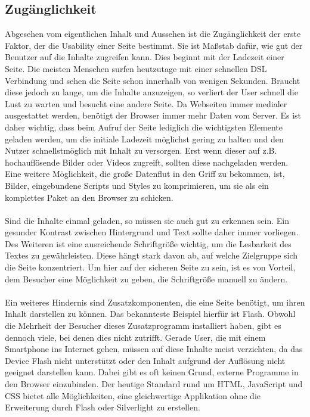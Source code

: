 \subsection{Zugänglichkeit}


Abgesehen vom eigentlichen Inhalt und Aussehen ist die Zugänglichkeit der erste Faktor, der die Usability einer Seite bestimmt. Sie ist Maßstab dafür, wie gut der Benutzer auf die Inhalte zugreifen kann. Dies beginnt mit der Ladezeit einer Seite. Die meisten Menschen surfen heutzutage mit einer schnellen DSL Verbindung und sehen die Seite schon innerhalb von wenigen Sekunden. Braucht diese jedoch zu lange, um die Inhalte anzuzeigen, so verliert der User schnell die Lust zu warten und besucht eine andere Seite. Da Webseiten immer medialer ausgestattet werden, benötigt der Browser immer mehr Daten vom Server. Es ist daher wichtig, dass beim Aufruf der Seite lediglich die wichtigsten Elemente geladen werden, um die initiale Ladezeit möglichst gering zu halten und den Nutzer schnellstmöglich mit Inhalt zu versorgen. Erst wenn dieser auf z.B. hochauflösende Bilder oder Videos zugreift, sollten diese nachgeladen werden. Eine weitere Möglichkeit, die große Datenflut in den Griff zu bekommen, ist, Bilder, eingebundene Scripts und Styles zu komprimieren, um sie als ein komplettes Paket an den Browser zu schicken.\\
\\
Sind die Inhalte einmal geladen, so müssen sie auch gut zu erkennen sein. Ein gesunder Kontrast zwischen Hintergrund und Text sollte daher immer vorliegen. Des Weiteren ist eine ausreichende Schriftgröße wichtig, um die Lesbarkeit des Textes zu gewährleisten. Diese hängt stark davon ab, auf welche Zielgruppe sich die Seite konzentriert. Um hier auf der sicheren Seite zu sein, ist es von Vorteil, dem Besucher eine Möglichkeit zu geben, die Schriftgröße manuell zu ändern.\\
\\
Ein weiteres Hindernis sind Zusatzkomponenten, die eine Seite benötigt, um ihren Inhalt darstellen zu können. Das bekannteste Beispiel hierfür ist Flash. Obwohl die Mehrheit der Besucher dieses Zusatzprogramm installiert haben, gibt es dennoch viele, bei denen dies nicht zutrifft. Gerade User, die mit einem Smartphone ins Internet gehen, müssen auf diese Inhalte meist verzichten, da das Device Flash nicht unterstützt oder den Inhalt aufgrund der Auflösung nicht geeignet darstellen kann. Dabei gibt es oft keinen Grund, externe Programme in den Browser einzubinden. Der heutige Standard rund um HTML, JavaScript und CSS bietet alle Möglichkeiten, eine gleichwertige Applikation ohne die Erweiterung durch Flash oder Silverlight zu erstellen.\\
